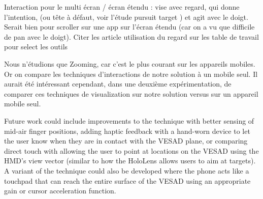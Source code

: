 Interaction pour le multi écran / écran étendu : vise avec regard, qui donne l'intention, (ou tête à défaut, voir l'étude pursuit target \citep{Esteves2017}) et agit avec le doigt. Serait bien pour scroller sur une app sur l'écran étendu (car on a vu que difficile de pan avec le doigt). Citer les article utilisation du regard sur les table de travail pour select les outils

Nous n'étudions que Zooming, car c'est le plus courant sur les appareils mobiles. Or on compare les techniques d'interactions de notre solution à un mobile seul. Il aurait été intéressant cependant, dans une deuxième expérimentation, de comparer ces techniques de visualization sur notre solution versus sur un appareil mobile seul.

Future work could include improvements to the  technique with better sensing of mid-air finger positions, adding haptic feedback
with a hand-worn device to let the user know when they are in contact with the VESAD plane, or comparing direct touch with allowing the user to point at locations on the VESAD using the HMD's view vector (similar to how the HoloLens allows users to aim at targets). A variant of the  technique could also be developed where the phone acts like a touchpad that can reach the entire surface of the VESAD using an appropriate gain or cursor acceleration function.



